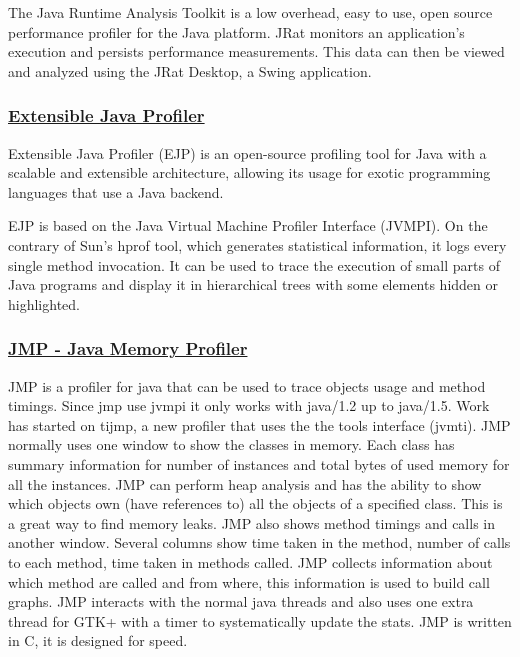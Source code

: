 The Java Runtime Analysis Toolkit is a low overhead, easy to use, open source performance profiler for the Java platform. JRat monitors an application's execution and persists performance measurements. This data can then be viewed and analyzed using the JRat Desktop, a Swing application.


\subsubsection{\href{http://ejp.sourceforge.net/}{Extensible Java Profiler}}

Extensible Java Profiler (EJP) is an open-source profiling tool for Java with a scalable and extensible architecture, allowing its usage for exotic programming languages that use a Java backend.

EJP is based on the Java Virtual Machine Profiler Interface (JVMPI). On the contrary of Sun's hprof tool, which generates statistical information, it logs every single method invocation. It can be used to trace the execution of small parts of Java programs and display it in hierarchical trees with some elements hidden or highlighted.


\subsubsection{\href{http://www.khelekore.org/jmp/}{JMP - Java Memory Profiler}}

JMP is a profiler for java that can be used to trace objects usage and method timings. Since jmp use jvmpi it only works with java/1.2 up to java/1.5. Work has started on tijmp, a new profiler that uses the the tools interface (jvmti). JMP normally uses one window to show the classes in memory. Each class has summary information for number of instances and total bytes of used memory for all the instances. JMP can perform heap analysis and has the ability to show which objects own (have references to) all the objects of a specified class. This is a great way to find memory leaks. JMP also shows method timings and calls in another window. Several columns show time taken in the method, number of calls to each method, time taken in methods called. 
JMP collects information about which method are called and from where, this information is used to build call graphs. JMP interacts with the normal java threads and also uses one extra thread for GTK+ with a timer to systematically update the stats. JMP is written in C, it is designed for speed. 


